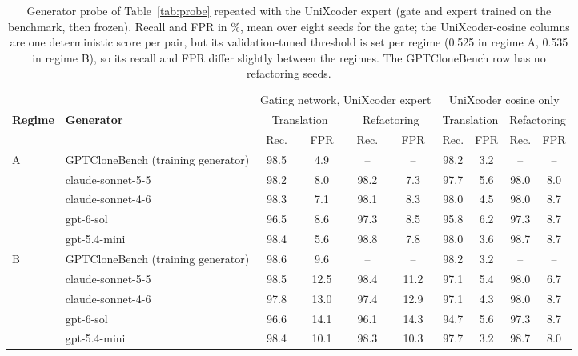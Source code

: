 \begin{table}[t]
\centering
\caption{Generator probe of Table~\ref{tab:probe} repeated with the UniXcoder expert (gate and expert trained on the benchmark, then frozen). Recall and FPR in \%, mean over eight seeds for the gate; the UniXcoder-cosine columns are one deterministic score per pair, but its validation-tuned threshold is set per regime (0.525 in regime A, 0.535 in regime B), so its recall and FPR differ slightly between the regimes. The GPTCloneBench row has no refactoring seeds.}
\label{tab:probe-ux}
\footnotesize
\setlength{\tabcolsep}{3.5pt}
\begin{tabular}{ll|cc|cc|cc|cc}
\toprule
 & & \multicolumn{4}{c|}{Gating network, UniXcoder expert} & \multicolumn{4}{c}{UniXcoder cosine only} \\
\textbf{Regime} & \textbf{Generator} & \multicolumn{2}{c}{Translation} & \multicolumn{2}{c|}{Refactoring} & \multicolumn{2}{c}{Translation} & \multicolumn{2}{c}{Refactoring} \\
 & & Rec. & FPR & Rec. & FPR & Rec. & FPR & Rec. & FPR \\
\midrule
A & GPTCloneBench (training generator) & 98.5 & 4.9 & -- & -- & 98.2 & 3.2 & -- & -- \\
 & claude-sonnet-5-5 & 98.2 & 8.0 & 98.2 & 7.3 & 97.7 & 5.6 & 98.0 & 8.0 \\
 & claude-sonnet-4-6 & 98.3 & 7.1 & 98.1 & 8.3 & 98.0 & 4.5 & 98.0 & 8.7 \\
 & gpt-6-sol & 96.5 & 8.6 & 97.3 & 8.5 & 95.8 & 6.2 & 97.3 & 8.7 \\
 & gpt-5.4-mini & 98.4 & 5.6 & 98.8 & 7.8 & 98.0 & 3.6 & 98.7 & 8.7 \\
\midrule
B & GPTCloneBench (training generator) & 98.6 & 9.6 & -- & -- & 98.2 & 3.2 & -- & -- \\
 & claude-sonnet-5-5 & 98.5 & 12.5 & 98.4 & 11.2 & 97.1 & 5.4 & 98.0 & 6.7 \\
 & claude-sonnet-4-6 & 97.8 & 13.0 & 97.4 & 12.9 & 97.1 & 4.3 & 98.0 & 8.7 \\
 & gpt-6-sol & 96.6 & 14.1 & 96.1 & 14.3 & 94.7 & 5.6 & 97.3 & 8.7 \\
 & gpt-5.4-mini & 98.4 & 10.1 & 98.3 & 10.3 & 97.7 & 3.2 & 98.7 & 8.0 \\
\bottomrule
\end{tabular}
\end{table}